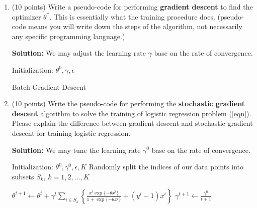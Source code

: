 \documentclass[twoside,10pt]{article}
\begin{document}
\begin{enumerate}
\begin{enumerate}
\item (10 points) Write a pseudo-code  for performing {\bf gradient descent} to find the optimizer $\theta^*$. This is essentially what the training procedure does. (pseudo-code  means you will write down the steps of the algorithm, not necessarily any specific programming language.)
\begin{tcolorbox}
\textbf{Solution:} We may adjust the learning rate $\gamma$ base on the rate of convergence. \\
\begin{algorithm}[H]
 \KwResult{${\theta^*}$}
 Initialization: $\theta^0, \gamma, \epsilon$\;
 \caption{Batch Gradient Descent}
\end{algorithm}
\end{tcolorbox}

\item (10 points) Write the pseudo-code for performing the {\bf stochastic gradient descent} algorithm to solve the training of logistic regression problem (\ref{eqn}). Please explain the difference between gradient descent and stochastic gradient descent for training logistic regression.
\begin{tcolorbox}
\textbf{Solution:} We may tune the learning rate $\gamma^0$ base on the rate of convergence. \\
\begin{algorithm}[H]
 \KwResult{${\theta^*}$}
 Initialization: $\theta^0, \gamma^0, \epsilon, K$\;
 Randomly split the indices of our data points into subsets $S_k$, $k = 1, 2, ..., K$  \;
 
 
  {
          {
                $\theta^{t+1} \leftarrow  \theta^t + \gamma^t \sum_{i \in S_k}  \left\{ \frac{x^i\exp\{-\theta x^i\}} {1+\exp\{-\theta x^i\}} + (y^i-1)x^i\right\}$\;
                $\gamma^{t+1} \leftarrow \frac{\gamma^0}{t+1}$          
          }
  }
 

\end{algorithm}
\end{tcolorbox}
\end{enumerate}
\end{enumerate}
\end{document}
